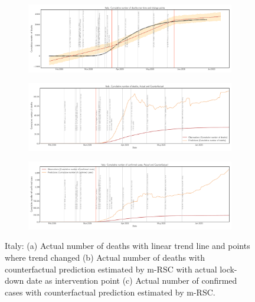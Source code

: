 \documentclass[fleqn,10pt]{wlscirep}
\begin{document}
\begin{figure}
	\centering
	\begin{subfigure}[b]{\textwidth}
		\centering
		\includegraphics[width=0.9\linewidth,height=0.2\textheight]{FIG13}
	\end{subfigure}
	
	\begin{subfigure}[b]{\textwidth}
		\centering
		\includegraphics[width=0.9\linewidth,height=0.2\textheight]{FIG14}
	\end{subfigure}
	
	\begin{subfigure}[b]{\textwidth}
		\centering
		\includegraphics[width=0.9\linewidth,height=0.2\textheight]{FIG15}
	\end{subfigure}
	
	\caption[Italy]{Italy: (a) Actual number of deaths with linear trend line and points where trend changed (b) Actual number of deaths with counterfactual prediction estimated by m-RSC with actual lock-down date as intervention point (c) Actual number of confirmed cases with counterfactual prediction estimated by m-RSC.}
	\label{fig6} 
\end{figure}
\end{document}
